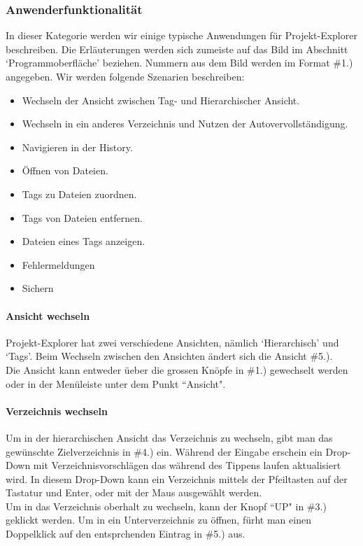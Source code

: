 \documentclass[10pt,paper=a4,final]{scrartcl}
\begin{document}
\subsubsection{Anwenderfunktionalit\"at}
In dieser Kategorie werden wir einige typische Anwendungen f\"ur Projekt-Explorer beschreiben. Die Erl\"auterungen werden sich zumeiste auf das Bild im Abschnitt ‘Programmoberfl\"ache’ beziehen. Nummern aus dem Bild werden im Format \#1.) angegeben.
Wir werden folgende Szenarien beschreiben:
\begin{itemize}
  \item Wechseln der Ansicht zwischen Tag- und Hierarchischer Ansicht.
  \item Wechseln in ein anderes Verzeichnis und Nutzen der Autovervollst\"andigung.
  \item Navigieren in der History.
  \item \"Offnen von Dateien.
  \item Tags zu Dateien zuordnen.
  \item Tags von Dateien entfernen.
  \item Dateien eines Tags anzeigen.
  \item Fehlermeldungen
  \item Sichern
\end{itemize}
\paragraph{Ansicht wechseln}
Projekt-Explorer hat zwei verschiedene Ansichten, n\"amlich ‘Hierarchisch’ und ‘Tags’. Beim Wechseln zwischen den Ansichten \"andert sich die Ansicht \#5.).\\
Die Ansicht kann entweder \"ueber die grossen Kn\"opfe in \#1.) gewechselt werden oder in der Men\"uleiste unter dem Punkt “Ansicht".
\paragraph{Verzeichnis wechseln}
Um in der hierarchischen Ansicht das Verzeichnis zu wechseln, gibt man das gew\"unschte Zielverzeichnis in \#4.) ein. W\"ahrend der Eingabe erschein ein Drop-Down mit Verzeichnisvorschl\"agen das w\"ahrend des Tippens laufen aktualisiert wird. In diesem Drop-Down kann ein Verzeichnis mittels der Pfeiltasten auf der Tastatur und Enter, oder mit der Maus ausgew\"ahlt werden.\\
Um in das Verzeichnis oberhalt zu wechseln, kann der Knopf “UP" in \#3.) geklickt werden. Um in ein Unterverzeichnis zu \"offnen, f\"urht man einen Doppelklick auf den entsprchenden Eintrag in \#5.) aus.
\end{document}
